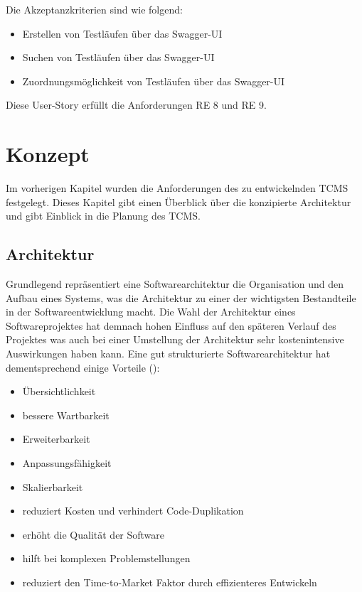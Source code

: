 \documentclass[a4paper, fontsize=11pt, parskip=half, twoside, headings=openright]{scrreprt}
\begin{document}
	Die Akzeptanzkriterien sind wie folgend:
	\begin{itemize}
		\item Erstellen von Testläufen über das Swagger-UI
		\item Suchen von Testläufen über das Swagger-UI
		\item Zuordnungsmöglichkeit von Testläufen über das Swagger-UI
	\end{itemize}
	
	Diese User-Story erfüllt die Anforderungen RE 8 und RE 9.
	
	\chapter{Konzept}
	Im vorherigen Kapitel wurden die Anforderungen des zu entwickelnden \ac{TCMS} festgelegt.
	Dieses Kapitel gibt einen Überblick über die konzipierte Architektur und gibt Einblick in die Planung des \ac{TCMS}.
	
	\section{Architektur}
	Grundlegend repräsentiert eine Softwarearchitektur die Organisation und den Aufbau eines Systems, was die Architektur zu einer der wichtigsten Bestandteile in der Softwareentwicklung macht.
	Die Wahl der Architektur eines Softwareprojektes hat demnach hohen Einfluss auf den späteren Verlauf des Projektes was auch bei einer Umstellung der Architektur sehr kostenintensive Auswirkungen haben kann. 
	Eine gut strukturierte Softwarearchitektur hat dementsprechend einige Vorteile (\textcite{richards_fundamentals_2020}):
	
	\begin{itemize}
		\item Übersichtlichkeit
		\item bessere Wartbarkeit
		\item Erweiterbarkeit
		\item Anpassungsfähigkeit
		\item Skalierbarkeit
		\item reduziert Kosten und verhindert Code-Duplikation
		\item erhöht die Qualität der Software
		\item hilft bei komplexen Problemstellungen
		\item reduziert den Time-to-Market Faktor durch effizienteres Entwickeln
	\end{itemize}
	
\end{document}
